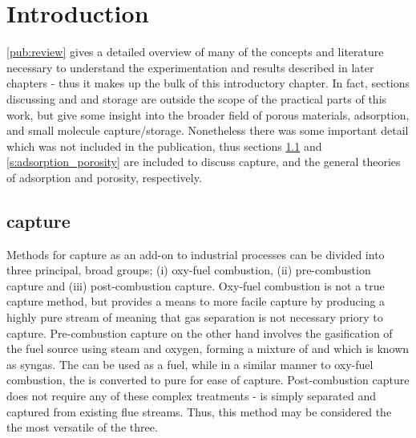 \chapter{Introduction}
\label{ch:introduction}
\ref{pub:review} gives a detailed overview of many of the concepts and literature necessary to understand the experimentation and results described in later chapters - thus it makes up the bulk of this introductory chapter. In fact, sections discussing  and  and  storage are outside the scope of the practical parts of this work, but give some insight into the broader field of porous materials, adsorption, and small molecule capture/storage. Nonetheless there was some important detail which was not included in the publication, thus sections \ref{s:ccs} and \ref{s:adsorption_porosity} are included to discuss  capture, and the general theories of adsorption and porosity, respectively.

\newpage
\section{\texorpdfstring{ capture}{CO2 capture}}
\label{s:ccs}

Methods for  capture as an add-on to industrial processes can be divided into three principal, broad groups; (i) oxy-fuel combustion, (ii) pre-combustion capture and (iii) post-combustion capture.\citep{kanniche2010pre} Oxy-fuel combustion is not a true  capture method, but provides a means to more facile  capture by producing a highly pure stream of  meaning that gas separation is not necessary priory to capture.\citep{stanger2015oxyfuel, wall2009overview} Pre-combustion capture on the other hand involves the gasification of the fuel source using steam and oxygen, forming a mixture of  and  which is known as syngas. The  can be used as a fuel, while in a similar manner to oxy-fuel combustion, the  is converted to pure  for ease of capture.\citep{jansen2015pre} Post-combustion capture does not require any of these complex treatments -  is simply separated and captured from existing flue streams.\citep{wang2017review, samanta2012post} Thus, this method may be considered the the most versatile of the three.


